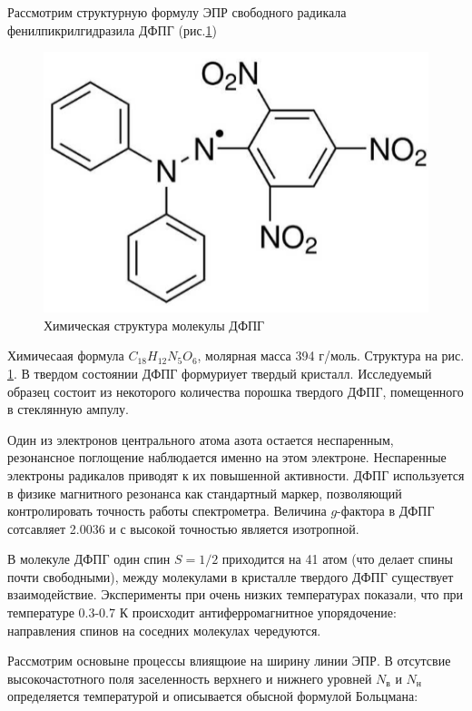 \documentclass[a4paper]{article}
\begin{document}
Рассмотрим структурную формулу ЭПР свободного радикала фенилпикрилгидразила ДФПГ (рис.\ref{matter})

\begin{figure}
    \includegraphics[scale = 0.6]{matter.png}
    \caption{{Химическая структура молекулы ДФПГ}}
    \label{matter}
\end{figure}

Химичесаая формула $C_{18}H_{12}N_5O_6$, молярная масса 394 г/моль.
Структура на рис. \ref{matter}. В твердом состоянии ДФПГ формуриует твердый кристалл. Исследуемый образец состоит из некоторого 
количества порошка твердого ДФПГ, помещенного в стеклянную ампулу. \par 

Один из электронов центрального атома азота остается неспаренным, резонансное поглощение наблюдается именно на этом электроне. 
Неспаренные электроны радикалов приводят к их повышенной активности.
ДФПГ используется в физике магнитного резонанса как стандартный маркер, позволяющий контролировать точность работы спектрометра. Величина $g$-фактора в ДФПГ 
сотсавляет 2.0036 и с высокой точностью является изотропной. \par 

В молекуле ДФПГ один спин $S = 1/2$ приходится на 41 атом (что делает спины почти свободными), между молекулами в кристалле твердого ДФПГ существует взаимодействие. 
Эксперименты при очень низких температурах показали, что при  температуре 0.3-0.7 К происходит антиферромагнитное упорядочение: направления спинов на соседних молекулах чередуются.\par 

Рассмотрим основыне процессы влиящюие на ширину линии ЭПР. В отсутсвие высокочастотного поля заселенность верхнего и нижнего уровней $N_в$ и $N_н$ 
определяется температурой и описывается обысной формулой Больцмана: 
\end{document}
